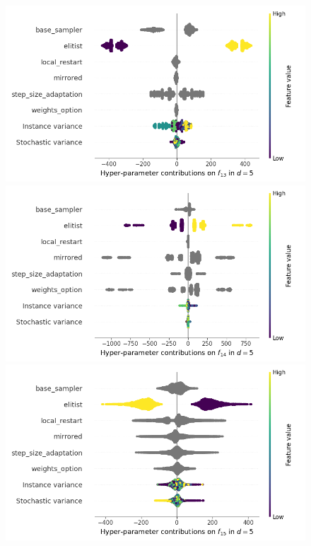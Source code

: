 \begin{figure}[t]
	\includegraphics[height=0.15\textheight,trim=0mm 0mm 30mm 0mm,clip]{images/img_summary_f13_d5.png}
	\includegraphics[height=0.15\textheight,trim=60mm 0mm 30mm 0mm,clip]{images/img_summary_f14_d5.png}
	\includegraphics[height=0.15\textheight,trim=60mm 0mm 30mm 0mm,clip]{images/img_summary_f15_d5.png}

\end{figure}
